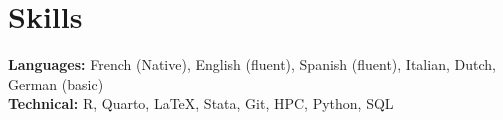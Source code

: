 \documentclass[12pt]{article}
\makeatletter
\newcommand{\CVSubheading}[4]{
  \vspace{-2pt}\item
    \begin{tabular*}{0.97\textwidth}[t]{l@{\extracolsep{\fill}}r}
      \textbf{#1} & #2 \\
      \small#3 & \small #4 \\
    \end{tabular*}\vspace{-7pt}
}
\newcommand{\CVSubHeadingListStart}{\begin{itemize}[leftmargin=0.5cm, label={}]}
\newcommand{\CVSubHeadingListEnd}{\end{itemize}}
\makeatother
\begin{document}
 



%


\section{Skills}
 \begin{itemize}[leftmargin=0.5cm, label={}]
    \small{\item{
     \textbf{Languages:}{ French (Native), English (fluent), Spanish (fluent), Italian, Dutch, German (basic)} \\
     \textbf{Technical:}{ R, Quarto, \LaTeX{}, Stata, Git, HPC, Python, SQL} 
    }}
 \end{itemize}
    
\end{document}
